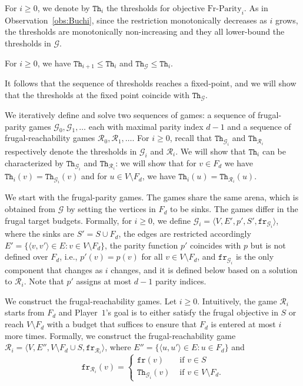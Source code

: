 \documentclass{article}\providecommand{\nequiv}{\not\equiv}\usepackage[a4paper,margin=20mm]{geometry}
\newcommand{\PO}{Player~$1$\xspace}
\newcommand{\G}{{\mathcal G}}
\newcommand{\R}{{\mathcal R}}
\newcommand{\fr}{\texttt{fr}}
\newcommand{\notFd}{V \setminus F_d}
\newcommand{\thresh}{\texttt{Th}\xspace}
\newcommand{\frparity}{\text{Fr-Parity}}
\newcommand{\zug}[1]{\langle #1  \rangle}
\renewcommand{\set}[1]{\{ #1  \}}
\begin{document}
For $i \geq 0$, we denote by $\thresh_i$ the thresholds for objective $\frparity_i$. As in Observation~\ref{obs:Buchi}, since the restriction monotonically decreases as $i$ grows, the thresholds are monotonically non-increasing and they all lower-bound the thresholds in $\G$.

\begin{observation}
\label{obs:parity}
For $i \geq 0$, we have $\thresh_{i+1} \leq \thresh_i$ and $\thresh_{\G} \leq \thresh_i$. 
\end{observation}
It follows that the sequence of thresholds reaches a fixed-point, and we will show that the thresholds at the fixed point coincide with $\thresh_\G$. 

We iteratively define and solve two sequences of games: a sequence of frugal-parity games $\G_0,\G_1,\ldots$ each with maximal parity index $d-1$ and a sequence of frugal-reachability games $\R_0,\R_1,\ldots$. For $i \geq 0$, recall that $\thresh_{\G_i}$ and $\thresh_{\R_i}$ respectively denote the thresholds in $\G_i$ and $\R_i$. We will show that $\thresh_i$ can be characterized by $\thresh_{\G_i}$ and $\thresh_{\R_i}$: we will show that for $v \in F_d$ we have $\thresh_i(v) = \thresh_{\G_i}(v)$ and for $u \in \notFd$, we have $\thresh_i(u) = \thresh_{\R_i}(u)$. 

We start with the frugal-parity games. The games share the same arena, which is obtained from $\G$ by setting the vertices in $F_d$ to be sinks. 
The games differ in the frugal target budgets. Formally, for $i \geq 0$, we define $\G_i = \zug{V, E', p', S', \fr_{\G_i}}$, where the sinks are $S' = S \cup F_d$, the edges are restricted accordingly $E' = \set{\zug{v, v'} \in E: v \in \notFd}$, the parity function $p'$ coincides with $p$ but is not defined over $F_d$, i.e., $p'(v) = p(v)$ for all $v \in V \setminus F_d$, and $\fr_{\G_i}$ is the only component that changes as \(i\) changes, and it is defined below based on a solution to $\R_i$.   Note that $p'$ assigns at most $d-1$ parity indices. 



We construct the frugal-reachability games. Let $i \geq 0$. Intuitively, the game $\R_i$ starts from $F_d$ and \PO's goal is to either satisfy the frugal objective in $S$ or reach $\notFd$ with a budget that suffices to ensure that $F_d$ is entered at most $i$ more times. Formally, we construct the frugal-reachability game $\R_i = \zug{V, E'', \notFd \cup S, \fr_{\R_i}}$, where $E'' = \set{\zug{u, u'} \in E: u \in F_d}$ and 
\[
\fr_{\R_i}(v) = \begin{cases}\fr(v) & \text{ if } v \in S\\ \thresh_{\G_i}(v) & \text{ if } v \in \notFd. \end{cases}
\]
\end{document}
